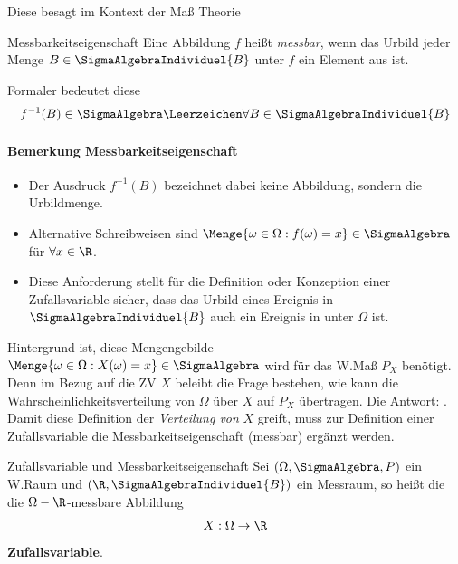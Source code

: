 Diese besagt im Kontext der Maß Theorie
\begin{Lemma-Definition}{Messbarkeitseigenschaft}
	Eine Abbildung $f$ heißt \textit{messbar}, wenn das Urbild jeder Menge $B\in\SigmaAlgebraIndividuel{B}$ unter $f$ ein Element aus \SigmaAlgebra ist.
\end{Lemma-Definition}
Formaler bedeutet diese
\begin{align}
	f^{-1}(B)\in \SigmaAlgebra\Leerzeichen \forall B\in \SigmaAlgebraIndividuel{B}
\end{align}
\paragraph{Bemerkung Messbarkeitseigenschaft}
\begin{itemize}
	\item Der Ausdruck $f^{-1}(B)$ bezeichnet dabei keine Abbildung, sondern die Urbildmenge.
	\item Alternative Schreibweisen sind $\Menge{\omega\in \Omega: f(\omega)=x}\in \SigmaAlgebra$ für $\forall x\in \R$.
	\item Diese Anforderung stellt für die Definition oder Konzeption einer Zufallsvariable sicher, dass das Urbild eines Ereignis in $\SigmaAlgebraIndividuel{B}$ auch ein Ereignis in \SigmaAlgebra unter $\Omega$ ist.
\end{itemize}
Hintergrund ist, diese Mengengebilde $\Menge{\omega \in \Omega: X(\omega) = x} \in \SigmaAlgebra$ wird für das \gls{W.}Maß $P_X$ benötigt. Denn im Bezug auf die \gls{ZV} $X$ beleibt die Frage bestehen, wie kann die Wahrscheinlichkeitsverteilung von $\Omega$ über $X$ auf $P_X$ übertragen. Die Antwort: .
Damit diese Definition der \textit{Verteilung von} $X$ greift, muss zur Definition einer Zufallsvariable die Messbarkeitseigenschaft (messbar) ergänzt werden.
\begin{Definition}{Zufallsvariable und Messbarkeitseigenschaft}
	Sei $(\Omega, \SigmaAlgebra, P)$ ein \gls{W.}Raum und $(\R, \SigmaAlgebraIndividuel{B})$ ein Messraum, so heißt die die $\Omega-\R$-messbare Abbildung
	\begin{align*}
		X: \Omega \rightarrow \R
	\end{align*}
	\textbf{Zufallsvariable}.
\end{Definition}

